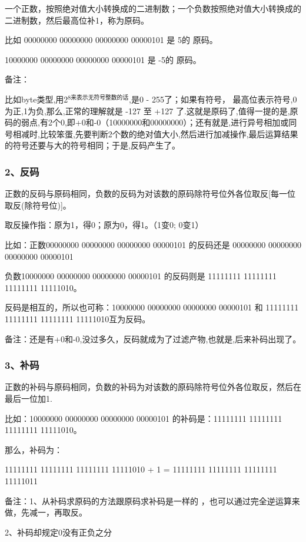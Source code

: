 \documentclass[9pt, b5paper]{article}
\begin{document}
一个正数，按照绝对值大小转换成的二进制数；一个负数按照绝对值大小转换成的二进制数，然后最高位补1，称为原码。

比如 00000000 00000000 00000000 00000101 是 5的 原码。

10000000 00000000 00000000 00000101 是 -5的 原码。

备注：

比如byte类型,用2$^{\text{8来表示无符号整数的话}}$,是0 - 255了；如果有符号， 最高位表示符号,0为正,1为负,那么,正常的理解就是 -127 至 +127 了.这就是原码了,值得一提的是,原码的弱点,有2个0,即+0和-0（10000000和00000000）；还有就是,进行异号相加或同号相减时,比较笨蛋,先要判断2个数的绝对值大小,然后进行加减操作,最后运算结果的符号还要与大的符号相同；于是,反码产生了。

\subsubsection{2、反码}
\label{sec-2-1-2}

正数的反码与原码相同，负数的反码为对该数的原码除符号位外各位取反[每一位取反(除符号位)]。

取反操作指：原为1，得0；原为0，得1。（1变0; 0变1）

比如：正数00000000 00000000 00000000 00000101  的反码还是 00000000 00000000 00000000 00000101

负数10000000 00000000 00000000 00000101  的反码则是 11111111 11111111 11111111 11111010。

反码是相互的，所以也可称：10000000 00000000 00000000 00000101 和 11111111 11111111 11111111 11111010互为反码。

备注：还是有+0和-0,没过多久，反码就成为了过滤产物,也就是,后来补码出现了。

\subsubsection{3、补码}
\label{sec-2-1-3}

正数的补码与原码相同，负数的补码为对该数的原码除符号位外各位取反，然后在最后一位加1.

比如：10000000 00000000 00000000 00000101 的补码是：11111111 11111111 11111111 11111010。

那么，补码为：

11111111 11111111 11111111 11111010 + 1 = 11111111 11111111 11111111 11111011

备注：1、从补码求原码的方法跟原码求补码是一样的 ，也可以通过完全逆运算来做，先减一，再取反。

2、补码却规定0没有正负之分
\end{document}
